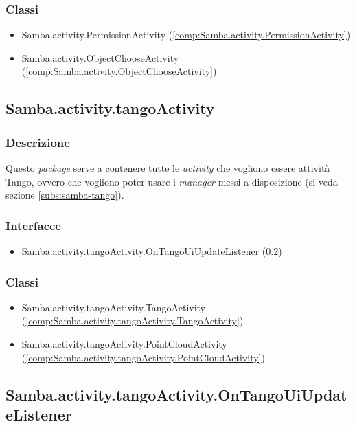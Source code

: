 \subsubsection{Classi}
\begin{itemize}
	\item Samba.activity.PermissionActivity (\ref{comp:Samba.activity.PermissionActivity})
	\item Samba.activity.ObjectChooseActivity (\ref{comp:Samba.activity.ObjectChooseActivity})
\end{itemize}

\subsection{Samba.activity.tangoActivity}\label{comp:Samba.activity.tangoActivity}
\subsubsection{Descrizione}
Questo \emph{package} serve a contenere tutte le \emph{activity} che vogliono essere attività Tango, ovvero che vogliono poter usare i \emph{manager} messi a disposizione (si veda sezione \ref{subs:samba-tango}).
\subsubsection{Interfacce}
\begin{itemize}
	\item Samba.activity.tangoActivity.OnTangoUiUpdateListener (\ref{comp:Samba.activity.tangoActivity.OnTangoUiUpdateListener})
\end{itemize}
\subsubsection{Classi}
\begin{itemize}
	\item Samba.activity.tangoActivity.TangoActivity (\ref{comp:Samba.activity.tangoActivity.TangoActivity})
	\item Samba.activity.tangoActivity.PointCloudActivity (\ref{comp:Samba.activity.tangoActivity.PointCloudActivity})
\end{itemize}

\subsection{Samba.activity.tangoActivity.OnTangoUiUpdateListener}\label{comp:Samba.activity.tangoActivity.OnTangoUiUpdateListener}
